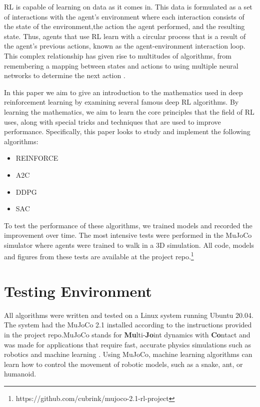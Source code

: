 \documentclass[conference]{IEEEtran}
\begin{document}
RL is capable of learning on data as it comes in. This data is formulated as a set of interactions with the agent's environment where each interaction consists of the state of the environment,the action the agent performed, and the resulting state. Thus, agents that use RL learn with a circular process that is a result of the agent's previous actions, known as the agent-environment interaction loop. This complex relationship has given rise to multitudes of algorithms, from remembering a mapping between states and actions to using multiple neural networks to determine the next action .

In this paper we aim to give an introduction to the mathematics used in deep reinforcement learning by examining several famous deep RL algorithms. By learning the mathematics, we aim to learn the core principles that the field of RL uses, along with special tricks and techniques that are used to improve performance. Specifically, this paper looks to study and implement the following algorithms:
\begin{itemize}
    \item REINFORCE
    \item A2C
    \item DDPG
    \item SAC
\end{itemize}

To test the performance of these algorithms, we trained models and recorded the improvement over time. The most intensive tests were performed in the MuJoCo simulator where agents were trained to walk in a 3D simulation. All code, models and figures from these tests are available at the project repo.\footnote{\label{repo}https://github.com/cubrink/mujoco-2.1-rl-project}

\section{Testing Environment}

All algorithms were written and tested on a Linux system running Ubuntu 20.04. The system had the MuJoCo 2.1 installed according to the instructions provided in the project repo.\footnotemark[\ref{repo}] MuJoCo stands for {\bf Mu}lti-{\bf Jo}int dynamics with {\bf Co}ntact and was made for applications that require fast, accurate physics simulations such as robotics and machine learning \cite{mujoco_docs}. Using MuJoCo, machine learning algorithms can learn how to control the movement of robotic models, such as a snake, ant, or humanoid.
\end{document}
